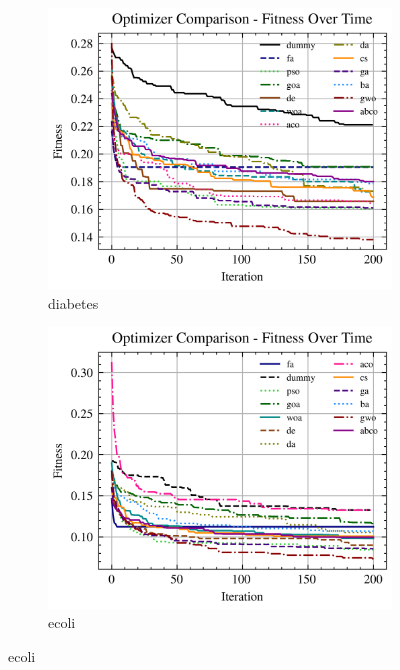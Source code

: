 \begin{figure}[htp]
    \begin{subfigure}[htp]{0.45\textwidth}
        \includegraphics[width=\textwidth]{imagenes/fitness_charts/img/binary/diabetes/optimizers_fitness_svc.png}
        \caption{diabetes}
        \label{fig:convergencia_diabetes_svc}
    \end{subfigure}
    \begin{subfigure}[htp]{0.45\textwidth}
        \includegraphics[width=\textwidth]{imagenes/fitness_charts/img/binary/ecoli/optimizers_fitness_svc.png}
        \caption{ecoli}
        \label{fig:convergencia_ecoli_svc}
    \end{subfigure}


\end{figure}
